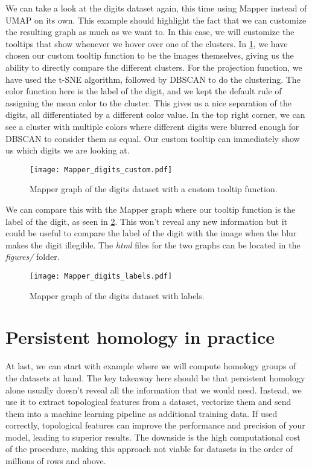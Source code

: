 We can take a look at the digits dataset again, this time using Mapper instead of UMAP on its own. This example should highlight the fact that we can customize the resulting graph as much as we want to. In this case, we will customize the tooltips that show whenever we hover over one of the clusters. In \ref{fig:mapper_digits_custom}, we have chosen our custom tooltip function to be the images themselves, giving us the ability to directly compare the different clusters. For the projection function, we have used the t-SNE algorithm, followed by DBSCAN to do the clustering. The color function here is the label of the digit, and we kept the default rule of assigning the mean color to the cluster. This gives us a nice separation of the digits, all differentiated by a different color value. In the top right corner, we can see a cluster with multiple colors where different digits were blurred enough for DBSCAN to consider them as equal. Our custom tooltip can immediately show us which digits we are looking at.

\begin{figure}[h!]
  \centering
  \texttt{[image: Mapper\_digits\_custom.pdf]}
  \caption{Mapper graph of the digits dataset with a custom tooltip function.}
  \label{fig:mapper_digits_custom}
\end{figure}

We can compare this with the Mapper graph where our tooltip function is the label of the digit, as seen in \ref{fig:mapper_digits_labels}. This won't reveal any new information but it could be useful to compare the label of the digit with the image when the blur makes the digit illegible. The \textit{html} files for the two graphs can be located in the \textit{figures/} folder.

\begin{figure}[h!]
  \centering
  \texttt{[image: Mapper\_digits\_labels.pdf]}
  \caption{Mapper graph of the digits dataset with labels.}
  \label{fig:mapper_digits_labels}
\end{figure}

\section{Persistent homology in practice}
At last, we can start with example where we will compute homology groups of the datasets at hand. The key takeaway here should be that persistent homology alone usually doesn't reveal all the information that we would need. Instead, we use it to extract topological features from a dataset, vectorize them and send them into a machine learning pipeline as additional training data. If used correctly, topological features can improve the performance and precision of your model, leading to superior results. The downside is the high computational cost of the procedure, making this approach not viable for datasets in the order of millions of rows and above.

